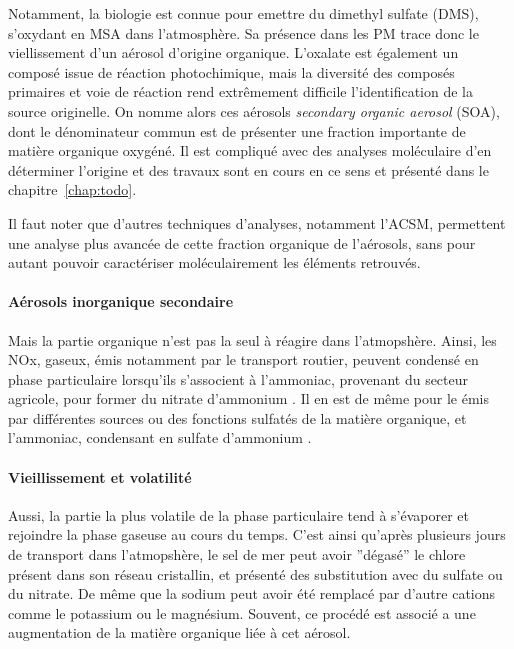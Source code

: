 Notamment, la biologie est connue pour emettre du dimethyl sulfate (DMS), s'oxydant en
MSA dans l'atmosphère. Sa présence dans les PM trace donc le viellissement d'un aérosol
d'origine organique.  L'oxalate est également un composé issue de réaction photochimique,
mais la diversité des composés primaires et voie de réaction rend extrêmement difficile
l'identification de la source originelle.
On nomme alors ces aérosols \textit{secondary organic aerosol} (SOA), dont le
dénominateur commun est de présenter une fraction importante de matière organique
oxygéné. Il est compliqué avec des analyses moléculaire d'en déterminer l'origine et des
travaux sont en cours en ce sens et présenté dans le chapitre~\ref{chap:todo}.

Il faut noter que d'autres techniques d'analyses, notamment l'ACSM, permettent une
analyse plus avancée de cette fraction organique de l'aérosols, sans pour autant pouvoir
caractériser moléculairement les éléments retrouvés.

\paragraph{Aérosols inorganique secondaire}%
\label{par:aérosols_inorganique_secondaire}

Mais la partie organique n'est pas la seul à réagire dans l'atmopshère. Ainsi, les NOx,
gaseux, émis notamment par le transport routier, peuvent condensé en phase particulaire
lorsqu'ils s'associent à l'ammoniac, provenant du secteur agricole, pour former du
nitrate d'ammonium . Il en est de même pour le  émis par différentes
sources ou des fonctions sulfatés de la matière organique, et l'ammoniac, condensant en
sulfate d'ammonium .

\paragraph{Vieillissement et volatilité}%
\label{par:vieillissement_et_volatilité}

Aussi, la partie la plus volatile de la phase particulaire tend à s'évaporer et rejoindre
la phase gaseuse au cours du temps. C'est ainsi qu'après plusieurs jours de transport
dans l'atmopshère, le sel de mer peut avoir ''dégasé'' le chlore présent dans son réseau
cristallin, et présenté des substitution avec du sulfate ou du nitrate. De même que la
sodium peut avoir été remplacé par d'autre cations comme le potassium ou le magnésium.
Souvent, ce procédé est associé a une augmentation de la matière organique liée à cet
aérosol.


